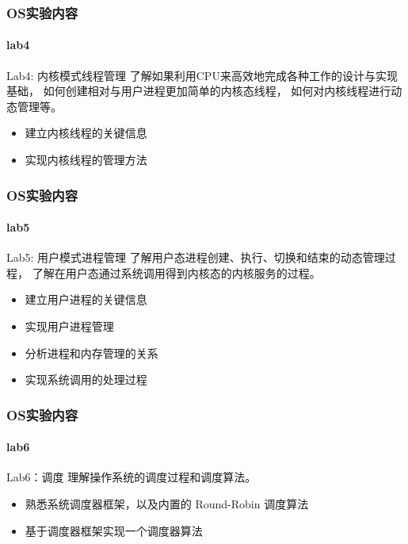 \documentclass[UTF8]{ctexbeamer}
\begin{document}
\begin{frame}
\frametitle{OS实验内容}
\framesubtitle{lab4}

\begin{block}{Lab4: 内核模式线程管理}
了解如果利用CPU来高效地完成各种工作的设计与实现基础，
如何创建相对与用户进程更加简单的内核态线程，
如何对内核线程进行动态管理等。
\end{block}

\begin{itemize}
    \item 建立内核线程的关键信息
    \item 实现内核线程的管理方法
\end{itemize}

\end{frame}


\begin{frame}
\frametitle{OS实验内容}
\framesubtitle{lab5}

\begin{block}{Lab5: 用户模式进程管理}
了解用户态进程创建、执行、切换和结束的动态管理过程，
了解在用户态通过系统调用得到内核态的内核服务的过程。
\end{block}

\begin{itemize}
    \item 建立用户进程的关键信息
    \item 实现用户进程管理
    \item 分析进程和内存管理的关系
    \item 实现系统调用的处理过程
\end{itemize}

\end{frame}

\begin{frame}
\frametitle{OS实验内容}
\framesubtitle{lab6}

\begin{block}{Lab6：调度}
理解操作系统的调度过程和调度算法。
\end{block}

\begin{itemize}
    \item 熟悉系统调度器框架，以及内置的 Round-Robin 调度算法
    \item 基于调度器框架实现一个调度器算法
\end{itemize}

\end{frame}
\end{document}
